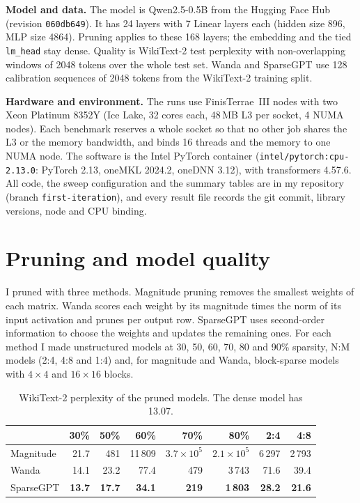 \documentclass[11pt,a4paper]{article}
\begin{document}
\textbf{Model and data.} The model is Qwen2.5-0.5B from the Hugging Face
Hub (revision \texttt{060db649}). It has 24 layers with 7 Linear layers
each (hidden size 896, MLP size 4864). Pruning applies to these 168 layers;
the embedding and the tied \texttt{lm\_head} stay dense. Quality is
WikiText-2 test perplexity with non-overlapping windows of 2048 tokens over
the whole test set. Wanda and SparseGPT use 128 calibration sequences of
2048 tokens from the WikiText-2 training split.

\textbf{Hardware and environment.} The runs use FinisTerrae~III nodes with
two Xeon Platinum 8352Y (Ice Lake, 32 cores each, 48\,MB L3 per socket, 4
NUMA nodes). Each benchmark reserves a whole socket so that no other job
shares the L3 or the memory bandwidth, and binds 16 threads and the memory
to one NUMA node. The software is the Intel PyTorch container
(\texttt{intel/pytorch:cpu-2.13.0}: PyTorch 2.13, oneMKL 2024.2, oneDNN
3.12), with transformers 4.57.6. All code, the sweep configuration and the
summary tables are in my repository (branch \texttt{first-iteration}), and
every result file records the git commit, library versions, node and CPU
binding.

\section{Pruning and model quality}

I pruned with three methods. Magnitude pruning removes the smallest weights
of each matrix. Wanda scores each weight by its magnitude times the norm of
its input activation and prunes per output row. SparseGPT uses second-order
information to choose the weights and updates the remaining ones. For each
method I made unstructured models at 30, 50, 60, 70, 80 and 90\% sparsity,
N:M models (2:4, 4:8 and 1:4) and, for magnitude and Wanda, block-sparse
models with $4\times4$ and $16\times16$ blocks.

\begin{table}[h]
\centering
\small
\begin{tabular}{lrrrrrrr}
\toprule
 & 30\% & 50\% & 60\% & 70\% & 80\% & 2:4 & 4:8 \\
\midrule
Magnitude & 21.7 & 481 & 11\,809 & $3.7\times10^5$ & $2.1\times10^5$ & 6\,297 & 2\,793 \\
Wanda     & 14.1 & 23.2 & 77.4 & 479 & 3\,743 & 71.6 & 39.4 \\
SparseGPT & \textbf{13.7} & \textbf{17.7} & \textbf{34.1} & \textbf{219} & \textbf{1\,803} & \textbf{28.2} & \textbf{21.6} \\
\bottomrule
\end{tabular}
\caption{WikiText-2 perplexity of the pruned models. The dense model has
13.07.}
\label{tab:ppl}
\end{table}
\end{document}
